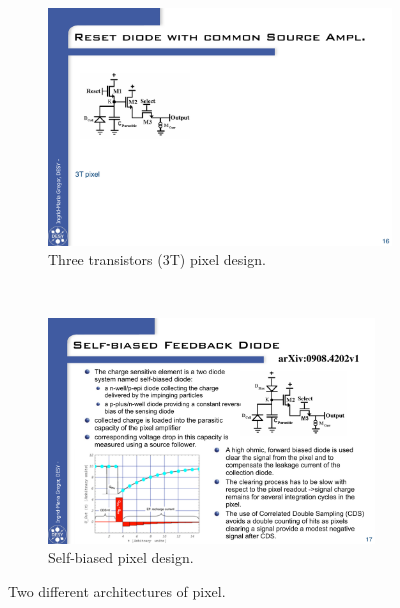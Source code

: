     \begin{figure}[!tbh]
      \centering
      \begin{subfigure}[t]{0.45\textwidth}
          \includegraphics[width=\textwidth]{Pictures/vxd/3T_architecture.pdf}
          \caption{Three transistors (3T) pixel design.}
          \label{fig:3T}
      \end{subfigure}
      ~%
      \begin{subfigure}[t]{0.45\textwidth}
          \includegraphics[width=0.95\textwidth]{Pictures/vxd/self-biased_architecture.pdf}
          \caption{Self-biased pixel design.}
          \label{fig:selfBiased}
      \end{subfigure}
      \caption{Two different architectures of pixel.}
      \label{fig:elecArch}
    \end{figure}    

